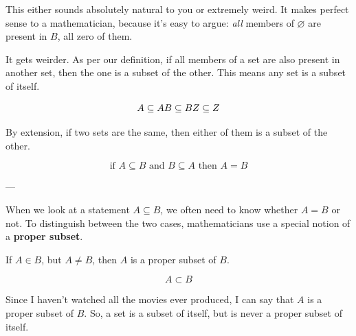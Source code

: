 \documentclass[a4paper, justified, notitlepage, sfsidenotes, notoc]{tufte-book}
\begin{document}
This either sounds absolutely natural to you or extremely weird. It makes perfect sense to a mathematician, because it's easy to argue: \emph{all} members of \(\varnothing\) are present in \(B\), all zero of them.

It gets weirder. As per our definition, if all members of a set are also present in another set, then the one is a subset of the other. This means any set is a subset of itself.

\begin{equation}
A \subseteq A \\
B \subseteq B \\
Z \subseteq Z
\end{equation}

By extension, if two sets are the same, then either of them is a subset of the other.

\begin{equation}
\textrm{if } A \subseteq B \textrm{ and } B \subseteq A \textrm{ then } A = B
\end{equation}

---

When we look at a statement \(A \subseteq B\), we often need to know whether \(A = B\) or not. To distinguish between the two cases, mathematicians use a special notion of a \textbf{proper subset}.

If \(A \in B\), but \(A \neq B\), then \(A\) is a proper subset of \(B\).

\begin{equation}
A \subset B
\end{equation}

Since I haven't watched all the movies ever produced, I can say that \(A\) is a proper subset of \(B\). So, a set is a subset of itself, but is never a proper subset of itself.
\end{document}
